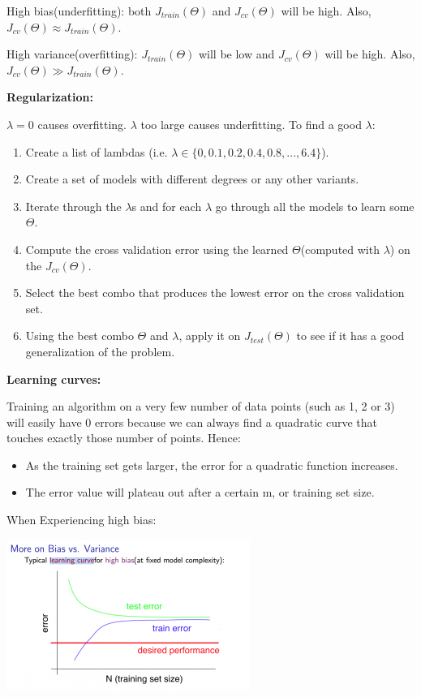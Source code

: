 \documentclass{article}
\begin{document}
\noindent High bias(underfitting): both \(J_{train}(\Theta)\) and \(J_{cv}(\Theta)\) will be high. Also, \(J_{cv}(\Theta) \approx J_{train}(\Theta)\). 

\noindent High variance(overfitting): \(J_{train}(\Theta)\) will be low and \(J_{cv}(\Theta)\) will be high. Also, \(J_{cv}(\Theta) \gg J_{train}(\Theta)\). 

\bigskip

\noindent \textbf{Regularization:}

\noindent \(\lambda = 0\) causes overfitting. \(\lambda\) too large causes underfitting. To find a good \(\lambda\):

\begin{enumerate}
\item Create a list of lambdas (i.e. \(\lambda \in \{0, 0.1, 0.2, 0.4, 0.8, ..., 6.4 \}\)).
\item Create a set of models with different degrees or any other variants.
\item Iterate through the \(\lambda\)s and for each \(\lambda\) go through all the models to learn some \(\Theta\).
\item Compute the cross validation error using the learned \(\Theta\)(computed with \(\lambda\)) on the \(J_{cv}(\Theta)\).
\item Select the best combo that produces the lowest error on the cross validation set.
\item Using the best combo \(\Theta\) and \(\lambda\), apply it on \(J_{test}(\Theta)\) to see if it has a good generalization of the problem.
\end{enumerate}

\noindent \textbf{Learning curves:}

\noindent Training an algorithm on a very few number of data points (such as 1, 2 or 3) will easily have 0 errors because we can always find a quadratic curve that touches exactly those number of points. Hence:

\begin{itemize}
\item As the training set gets larger, the error for a quadratic function increases.
\item The error value will plateau out after a certain m, or training set size.
\end{itemize}

\noindent When Experiencing high bias:

\begin{center}
\includegraphics[scale=0.6]{./images/experiencing_high_bias.png}
\end{center}
\end{document}
